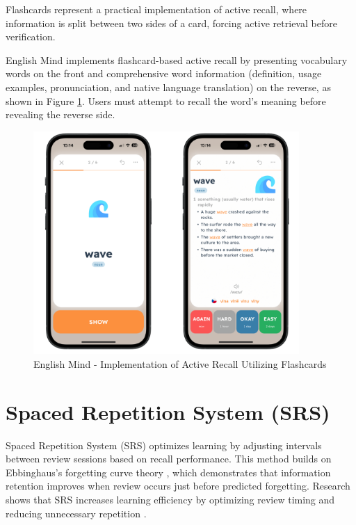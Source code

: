 Flashcards represent a practical implementation of active recall, where information is split between two sides of a card, forcing active retrieval before verification.

English Mind implements flashcard-based active recall by presenting vocabulary words on the front and comprehensive word information (definition, usage examples, pronunciation, and native language translation) on the reverse, as shown in Figure \ref{fig:em-flashcards}. Users must attempt to recall the word's meaning before revealing the reverse side.

\begin{figure}[!h]
    \includegraphics[width=0.9\textwidth]{src/figures/em-flashcards.png}
    \caption{English Mind - Implementation of Active Recall Utilizing Flashcards}
    \label{fig:em-flashcards}
\end{figure}

\section{Spaced Repetition System (SRS)}

Spaced Repetition System (SRS) optimizes learning by adjusting intervals between review sessions based on recall performance. This method builds on Ebbinghaus's forgetting curve theory \cite{cite:ebbinghaus2013_memory_contribution_to_experimantal_psychology}, which demonstrates that information retention improves when review occurs just before predicted forgetting. Research shows that SRS increases learning efficiency by optimizing review timing and reducing unnecessary repetition \cite{cite:kang2016_spaced_repetiton_promotes_efficient_learning}.

